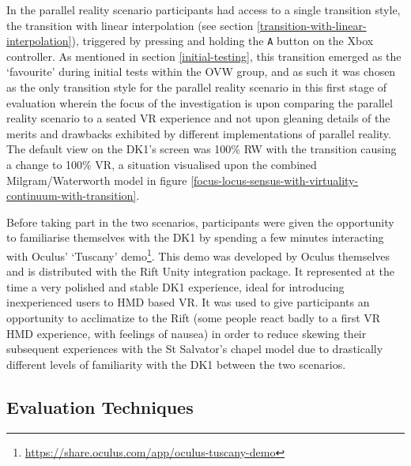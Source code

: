 In the parallel reality scenario participants had access to a single transition style, the transition with linear interpolation (see section \ref{transition-with-linear-interpolation}), triggered by pressing and holding the \texttt{A} button on the Xbox controller. As mentioned in section \ref{initial-testing}, this transition emerged as the `favourite' during initial tests within the OVW group, and as such it was chosen as the only transition style for the parallel reality scenario in this first stage of evaluation wherein the focus of the investigation is upon comparing the parallel reality scenario to a seated VR experience and not upon gleaning details of the merits and drawbacks exhibited by different implementations of parallel reality. The default view on the DK1's screen was 100\% RW with the transition causing a change to 100\% VR, a situation visualised upon the combined Milgram/Waterworth model in figure \ref{focus-locus-sensus-with-virtuality-continuum-with-transition}.

Before taking part in the two scenarios, participants were given the opportunity to familiarise themselves with the DK1 by spending a few minutes interacting with Oculus' `Tuscany' demo\footnote{\url{https://share.oculus.com/app/oculus-tuscany-demo}}. This demo was developed by Oculus themselves and is distributed with the Rift Unity integration package. It represented at the time a very polished and stable DK1 experience, ideal for introducing inexperienced users to HMD based VR. It was used to give participants an opportunity to acclimatize to the Rift (some people react badly to a first VR HMD experience, with feelings of nausea) in order to reduce skewing their subsequent experiences with the St Salvator's chapel model due to drastically different levels of familiarity with the DK1 between the two scenarios.


\subsection{Evaluation Techniques}

